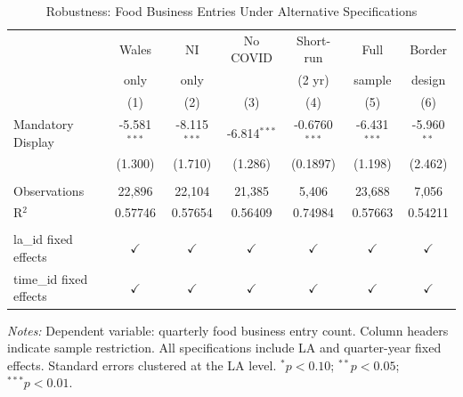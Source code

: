 
\begin{table}[htbp]
   \caption{\label{tab:robust} Robustness: Food Business Entries Under Alternative Specifications}
   \bigskip
   \centering
   \small
   \begin{tabular}{lcccccc}
      \toprule
       & Wales & NI & No COVID & Short-run & Full & Border\\
       & only & only & & (2 yr) & sample & design\\
                              & (1)            & (2)            & (3)            & (4)             & (5)            & (6)\\
      \midrule
      Mandatory Display       & -5.581$^{***}$ & -8.115$^{***}$ & -6.814$^{***}$ & -0.6760$^{***}$ & -6.431$^{***}$ & -5.960$^{**}$\\
                              & (1.300)        & (1.710)        & (1.286)        & (0.1897)        & (1.198)        & (2.462)\\
       \\
      Observations            & 22,896         & 22,104         & 21,385         & 5,406           & 23,688         & 7,056\\
      R$^2$                   & 0.57746        & 0.57654        & 0.56409        & 0.74984         & 0.57663        & 0.54211\\
       \\
      la\_id fixed effects    & $\checkmark$   & $\checkmark$   & $\checkmark$   & $\checkmark$    & $\checkmark$   & $\checkmark$\\
      time\_id fixed effects  & $\checkmark$   & $\checkmark$   & $\checkmark$   & $\checkmark$    & $\checkmark$   & $\checkmark$\\
      \bottomrule
   \end{tabular}

   \par \raggedright
   \textit{Notes:} Dependent variable: quarterly food business entry count. Column headers indicate sample restriction. All specifications include LA and quarter-year fixed effects. Standard errors clustered at the LA level. $^{*}p<0.10$; $^{**}p<0.05$; $^{***}p<0.01$.
\end{table}


